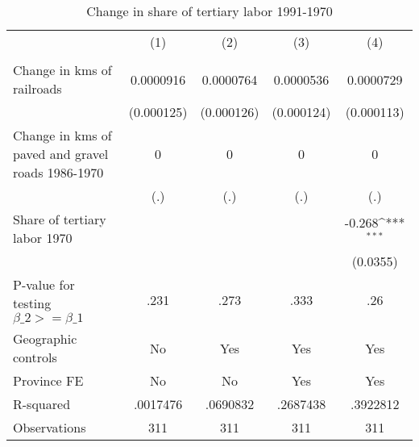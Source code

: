 \begin{table}[htbp]\centering
\def\sym#1{\ifmmode^{#1}\else\(^{#1}\)\fi}
\caption{Change in share of tertiary labor 1991-1970}
\begin{tabular}{l*{4}{c}}
\hline\hline
                &\multicolumn{1}{c}{(1)}&\multicolumn{1}{c}{(2)}&\multicolumn{1}{c}{(3)}&\multicolumn{1}{c}{(4)}\\
                &\multicolumn{1}{c}{}&\multicolumn{1}{c}{}&\multicolumn{1}{c}{}&\multicolumn{1}{c}{}\\
\hline
Change in kms of railroads&0.0000916         &0.0000764         &0.0000536         &0.0000729         \\
                &(0.000125)         &(0.000126)         &(0.000124)         &(0.000113)         \\
[1em]
Change in kms of paved and gravel roads 1986-1970&        0         &        0         &        0         &        0         \\
                &      (.)         &      (.)         &      (.)         &      (.)         \\
[1em]
Share of tertiary labor 1970&                  &                  &                  &   -0.268\sym{***}\\
                &                  &                  &                  & (0.0355)         \\
\hline
P-value for testing $\beta\_{2} >= \beta\_{1}$&     .231         &     .273         &     .333         &      .26         \\
Geographic controls&       No         &      Yes         &      Yes         &      Yes         \\
Province FE     &       No         &       No         &      Yes         &      Yes         \\
R-squared       & .0017476         & .0690832         & .2687438         & .3922812         \\
Observations    &      311         &      311         &      311         &      311         \\
\hline\hline
\end{tabular}
\end{table}
